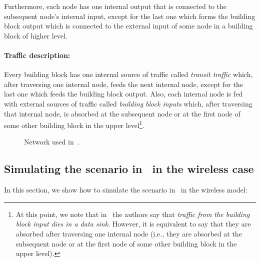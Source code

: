 \documentclass[journal,twocolumn]{./IEEEtran}
\begin{document}
Furthermore, each node has one internal output that is connected to the subsequent node's internal input, except for the last one which forms the building block output which is connected to the external input of some node in a building block of higher level.


\paragraph{Traffic description:}

Every building block has one internal source of traffic called \emph{transit traffic} which, after traversing one internal node, feeds the next internal node, except for the last one which feeds the building block output. Also, each internal node is fed with  external sources of traffic called \emph{building block inputs} which, after traversing that internal node, is absorbed at the subsequent node or at the first node of some other building block in the upper level\footnote{At this point, we note that in~\cite{DBLP:journals/ton/BennettBCCB02} the authors say that \emph{traffic from the building block input dies in a data sink}. However, it is equivalent to say that they are absorbed after traversing one internal node (i.e., they are absorbed at the subsequent node or at the first node of some other building block in the upper level).}.

\begin{figure*}
\begin{center}
\label{aaa}
\label{bbb}
\caption{Network used in~\cite{DBLP:journals/ton/BennettBCCB02}.}
\label{fig:aaa}
\end{center} 
\end{figure*}


\subsection{Simulating the scenario in~\cite{DBLP:journals/ton/BennettBCCB02} in the wireless case}
\label{wireless:scenario}

In this section, we show how to simulate the scenario in~\cite{DBLP:journals/ton/BennettBCCB02} in the wireless model:
\end{document}
